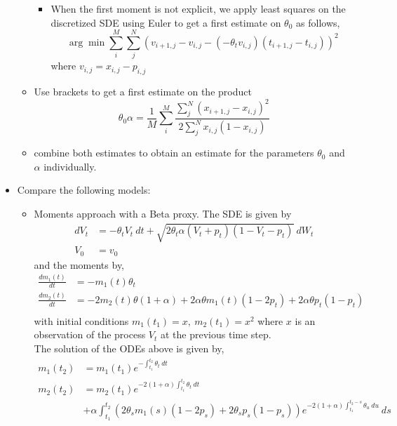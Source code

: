 \documentclass[a4paper, 12pt]{article}
\begin{document}
\begin{itemize}
\begin{itemize}
\begin{itemize}
			\item When the first moment is not explicit, we apply least squares on the discretized SDE using Euler to get a first estimate on $\theta_0$ as follows,
			$$ \arg\min \sum\limits_{i}^M \sum\limits_j^N \left( v_{i+1,j}  - v_{i,j}- \left( - \theta_t v_{i,j}\right) \left(t_{i+1,j} - t_{i,j} \right)  \right)^2 $$ where $v_{i,j}=x_{i,j}-p_{i,j}$
		\end{itemize} %
		\item Use brackets to get a first estimate on the product
		$$\theta_0 \alpha = \frac{1}{M} \sum\limits_i^M \frac{ \sum\limits_j^N (x_{i+1,j}  - x_{i,j})^2}{2 \sum\limits_j^N x_{i,j}(1-x_{i,j}) }$$
		\item combine both estimates to obtain an estimate for the parameters $\theta_0$ and $\alpha$ individually.
	\end{itemize}


\item Compare the following models:
	\begin{itemize}
		\item Moments approach with a Beta proxy. The SDE is given by
		\begin{equation}
		\begin{split}
		dV_t &=  - \theta_t V_t \  dt + \sqrt{2 \theta_t \alpha (V_t +p_t ) (1-V_t-p_t)} \  dW_t  \\ %
		V_0 & = v_0
	\end{split}\label{VtSDE}
	\end{equation}
		and the moments by,
		\begin{equation}
		\begin{split}
		\frac{d m_1 (t)}{dt} &= - m_1(t)\theta_t \\
		\frac{d m_2 (t)}{dt} &=  -2 m_2(t)\theta(1+\alpha) + 2\alpha\theta m_1(t)(1-2p_t) + 2 \alpha\theta p_t (1-p_t)\\
		\end{split}
		\end{equation}
		with initial conditions $m_1(t_1)=x,\ m_2(t_1)=x^2$ where $x$ is an observation of the process $V_t$ at the previous time step.\\
		The solution of the ODEs above is given by,
		\begin{equation}
		\begin{split}
			m_1(t_2) & = m_1(t_1) e^{-\int_{t_1}^{t_2} \theta_t \ dt }\\
		m_2(t_2) & = m_2 (t_1) e^{-2(1+\alpha)\int_{t_1}^{t_2} \theta_t \ dt} \\
		& + \alpha \int_{t_1}^{t_2} \left(2\theta_s m_1(s)( 1-2p_s)+ 2\theta_s p_s(1-p_s)\right)   e^{-2(1+\alpha)\int_{t_1}^{t_2-s} \theta_u \ du}  \ ds
		\end{split}
		\end{equation}


\end{itemize}
\end{itemize}
\end{document}
